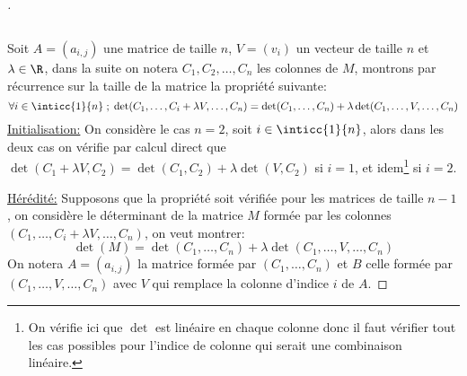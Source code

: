 \documentclass{report}
\begin{document}
   \pagebreak
   \begin{proof}[\unskip\nopunct]
      \subsection*{}
      Soit \(A = (a_{i, j})\) une matrice de taille \(n\), \(V = (v_i)\) un vecteur de taille \(n\) et \(\lambda \in \R\), dans la suite on notera \(C_1, C_2, \ldots, C_n\) les colonnes de \(M\), montrons par récurrence sur la taille de la matrice la propriété suivante:
      \[
         \forall i \in \inticc{1}{n} \; ; \; \det(C_1, \ldots, C_i + \lambda V, \ldots, C_n) = \det(C_1, \ldots, C_n) + \lambda\det(C_1, \ldots, V, \ldots, C_n)
      \]
      \underline{Initialisation:}
      On considère le cas \(n = 2\), soit \(i \in \inticc{1}{n}\), alors dans les deux cas on vérifie par calcul direct que \(\det(C_1 + \lambda V, C_2) = \det(C_1, C_2) + \lambda\det(V, C_2)\) si \(i = 1\), et idem\footnote[1]{On vérifie ici que \(\det\) est linéaire en chaque colonne donc il faut vérifier tout les cas possibles pour l'indice de colonne qui serait une combinaison linéaire.} si \(i = 2\).\<

      \underline{Hérédité:}
      Supposons que la propriété soit vérifiée pour les matrices de taille \(n - 1\), on considère le déterminant de la matrice \(M\) formée par les colonnes \((C_1, \ldots, C_i + \lambda V, \ldots, C_n)\), on veut montrer:
      \[
         \det(M) = \det(C_1, \ldots , C_n) + \lambda \det(C_1, \ldots, V, \ldots, C_n)
      \]
      On notera \(A = (a_{i, j})\) la matrice formée par \((C_1, \ldots , C_n)\) et \(B\) celle formée par \((C_1, \ldots, V, \ldots, C_n)\) avec \(V\) qui remplace la colonne d'indice \(i\) de \(A\).\<


\end{proof}
\end{document}
